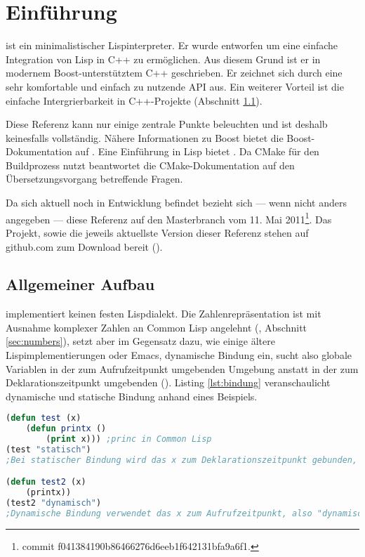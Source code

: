 \section{Einführung}
\label{sec:einfuehrung}

\projectname{} ist ein minimalistischer Lispinterpreter. Er wurde entworfen um eine einfache
Integration von Lisp in C++ zu ermöglichen. Aus diesem Grund ist er in modernem Boost-unterstütztem
C++ geschrieben. Er zeichnet sich durch eine sehr komfortable und einfach zu nutzende API aus.
Ein weiterer Vorteil ist die einfache Intergrierbarkeit in C++-Projekte (Abschnitt \ref{sec:environment}).

Diese Referenz kann nur einige zentrale Punkte beleuchten und ist deshalb keinesfalls vollständig. Nähere Informationen zu Boost bietet die Boost-Do\-ku\-men\-ta\-tion auf \cite{smart_ptr_online}. Eine Einführung in Lisp bietet \cite{graham_ansi_1995}. Da \projectname{} CMake für den Buildprozess nutzt beantwortet die CMake-Dokumentation auf \cite{cmake_online} den Übersetzungsvorgang betreffende Fragen.

Da sich \projectname{} aktuell noch in Entwicklung befindet bezieht sich --- wenn nicht anders angegeben --- diese Referenz auf den Masterbranch vom 11. Mai 2011\footnote{commit f041384190b86466276d6eeb1f642131bfa9a6f1.}.
Das Projekt, sowie die jeweils aktuellste Version dieser Referenz stehen auf github.com zum Download bereit (\cite{lisp_interaction_online}\cite{lisp_interaction_ref_online}). %

\subsection{Allgemeiner Aufbau}
\label{sec:environment}

\projectname{} implementiert keinen festen Lispdialekt. Die Zahlenrepräsentation ist mit Ausnahme komplexer Zahlen an Common Lisp angelehnt (\cite[S. 143ff]{graham_ansi_1995}, Abschnitt \ref{sec:numbers}), setzt aber im Gegensatz dazu, wie einige ältere Lispimplementierungen oder Emacs, dynamische Bindung ein, sucht also globale Variablen in der zum Aufrufzeitpunkt umgebenden Umgebung anstatt in der zum Deklarationszeitpunkt umgebenden (\cite[36, 63]{wilhelm_uebersetzerbau_2007}\cite[112]{graham_ansi_1995}). Listing \ref{lst:bindung} veranschaulicht dynamische und statische Bindung anhand eines Beispiels.

\begin{lstlisting}[caption={dynamische Bindung}, label=lst:bindung, language=Lisp]
(defun test (x)
    (defun printx ()
        (print x))) ;princ in Common Lisp
(test "statisch")
;Bei statischer Bindung wird das x zum Deklarationszeitpunkt gebunden, also "statisch"

(defun test2 (x)
    (printx))
(test2 "dynamisch")
;Dynamische Bindung verwendet das x zum Aufrufzeitpunkt, also "dynamisch"
\end{lstlisting}

